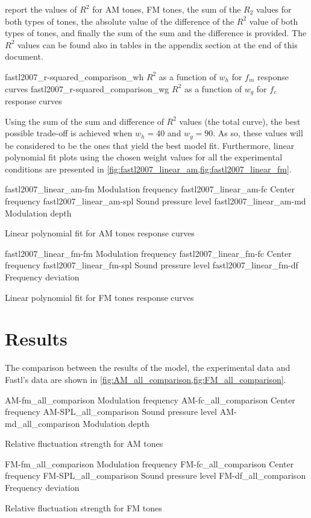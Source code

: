 \documentclass{article}
\begin{document}
report the values of $R^2$ for AM tones, FM tones, the sum of the $R_2$ values
for both types of tones, the absolute value of the difference of the $R^2$
value of both types of tones, and finally the sum of the sum and the difference
is provided. The $R^2$ values can be found also in tables in the appendix
section at the end of this document.

\myfigurepair%
  {fastl2007_r-squared_comparison_wh}
  {$R^2$ as a function of $w_h$ for $f_m$ response curves}
  {fastl2007_r-squared_comparison_wg}
  {$R^2$ as a function of $w_g$ for $f_c$ response curves}

Using the sum of the sum and difference of $R^2$ values (the total curve), the
best possible trade-off is achieved when $w_h = 40$ and $w_g = 90$. As so,
these values will be considered to be the ones that yield the best model fit.
Furthermore, linear polynomial fit plots using the chosen weight values for all
the experimental conditions are presented in
\cref{fig:fastl2007_linear_am,fig:fastl2007_linear_fm}.

\myfigurequad%
  {fastl2007_linear_am-fm}
  {Modulation frequency}
  {fastl2007_linear_am-fc}
  {Center frequency}
  {fastl2007_linear_am-spl}
  {Sound pressure level}
  {fastl2007_linear_am-md}
  {Modulation depth}
  {
    \caption{Linear polynomial fit for AM tones response curves}
    \label{fig:fastl2007_linear_am}
  }

\myfigurequad%
  {fastl2007_linear_fm-fm}
  {Modulation frequency}
  {fastl2007_linear_fm-fc}
  {Center frequency}
  {fastl2007_linear_fm-spl}
  {Sound pressure level}
  {fastl2007_linear_fm-df}
  {Frequency deviation}
  {
    \caption{Linear polynomial fit for FM tones response curves}
    \label{fig:fastl2007_linear_fm}
  }

\clearpage

\section{Results}
\label{sec:results}

The comparison between the results of the model, the experimental data and
Fastl's data are shown in \cref{fig:AM_all_comparison,fig:FM_all_comparison}.

\begin{comparison}

\myfigurequad%
  {AM-fm_all_comparison}
  {Modulation frequency}
  {AM-fc_all_comparison}
  {Center frequency}
  {AM-SPL_all_comparison}
  {Sound pressure level}
  {AM-md_all_comparison}
  {Modulation depth}
  {
    \caption{Relative fluctuation strength for AM tones}
    \label{fig:AM_all_comparison}
  }

\myfigurequad%
  {FM-fm_all_comparison}
  {Modulation frequency}
  {FM-fc_all_comparison}
  {Center frequency}
  {FM-SPL_all_comparison}
  {Sound pressure level}
  {FM-df_all_comparison}
  {Frequency deviation}
  {
    \caption{Relative fluctuation strength for FM tones}
    \label{fig:FM_all_comparison}
  }

\end{comparison}
\end{document}

